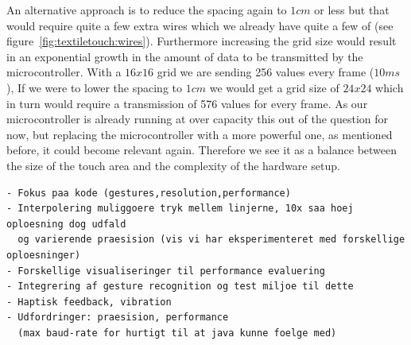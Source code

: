 An alternative approach is to reduce the spacing again to \(1cm\) or less but that would require quite a few extra wires which we already have quite a few of (see figure~\ref{fig:textiletouch:wires}).
Furthermore increasing the grid size would result in an exponential growth in the amount of data to be transmitted by the microcontroller.
With a \(16x16\) grid we are sending 256 values every frame (\(10ms\)),
If we were to lower the spacing to \(1cm\) we would get a grid size of \(24x24\) which in turn would require a transmission of 576 values for every frame.
As our microcontroller is already running at over capacity this out of the question for now, but replacing the microcontroller with a more powerful one, as mentioned before, it could become relevant again.
Therefore we see it as a balance between the size of the touch area and the complexity of the hardware setup.

\begin{verbatim}
- Fokus paa kode (gestures,resolution,performance)
- Interpolering muliggoere tryk mellem linjerne, 10x saa hoej oploesning dog udfald 
  og varierende praesision (vis vi har eksperimenteret med forskellige oploesninger)
- Forskellige visualiseringer til performance evaluering
- Integrering af gesture recognition og test miljoe til dette
- Haptisk feedback, vibration
- Udfordringer: praesision, performance 
  (max baud-rate for hurtigt til at java kunne foelge med)
\end{verbatim}